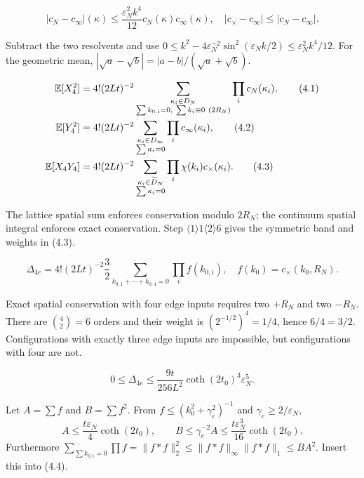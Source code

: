 \documentclass[11pt,a4paper]{article}
\newcommand{\eps}{\varepsilon}
\begin{document}
\[
 |c_N-c_\infty|(\kappa)
 \le\frac{\eps_N^2k^4}{12}c_N(\kappa)c_\infty(\kappa),\quad
 |c_\times-c_\infty|\le|c_N-c_\infty|.\tag{3.5}
\]

\Because Subtract the two resolvents and use
$0\le k^2-4\eps_N^{-2}\sin^2(\eps_Nk/2)\le\eps_N^2k^4/12$.
For the geometric mean,
$|\sqrt a-\sqrt b|=|a-b|/(\sqrt a+\sqrt b)$.

\QedStep


\begin{align*}
 \E[X_4^2]&=4!(2Lt)^{-2}
 \sum_{\substack{\kappa_i\in D_N\\\sum k_{0,i}=0,\ \sum k_i\equiv0\ (2R_N)}}
 \prod_i c_N(\kappa_i),\tag{4.1}\\
 \E[Y_4^2]&=4!(2Lt)^{-2}
 \sum_{\substack{\kappa_i\in D_\infty\\\sum\kappa_i=0}}
 \prod_i c_\infty(\kappa_i),\tag{4.2}\\
 \E[X_4Y_4]&=4!(2Lt)^{-2}
 \sum_{\substack{\kappa_i\in\widetilde D_N\\\sum\kappa_i=0}}
 \prod_i\chi(k_i)c_\times(\kappa_i).\tag{4.3}
\end{align*}

\Because The lattice spatial sum enforces conservation modulo $2R_N$; the continuum
spatial integral enforces exact conservation.  Step $\langle1\rangle1\langle2\rangle6$
gives the symmetric band and weights in (4.3).

\[
 \Delta_{4e}=4!(2Lt)^{-2}\frac32
 \sum_{k_{0,1}+\cdots+k_{0,4}=0}\prod_i f(k_{0,i}),\quad
 f(k_0)=c_\times(k_0,R_N).\tag{4.4}
\]

\Because Exact spatial conservation with four edge inputs requires two $+R_N$ and two
$-R_N$.  There are $\binom42=6$ orders and their weight is
$(2^{-1/2})^4=1/4$, hence $6/4=3/2$.  Configurations with exactly three edge inputs
are impossible, but configurations with four are not.

\[
 0\le\Delta_{4e}\le
 \frac{9t}{256L^2}\coth(2t_0)^3\eps_N^5.\tag{4.5}
\]

\Because Let $A=\sum f$ and $B=\sum f^2$.  From $f\le(k_0^2+\gamma_e^2)^{-1}$
and $\gamma_e\ge2/\eps_N$,
\[
 A\le\frac{t\eps_N}{4}\coth(2t_0),\qquad
 B\le\gamma_e^{-2}A\le\frac{t\eps_N^3}{16}\coth(2t_0).
\]
Furthermore
$\sum_{\sum k_{0,i}=0}\prod f=\|f*f\|_2^2
\le\|f*f\|_\infty\|f*f\|_1\le BA^2$.  Insert this into (4.4).
\end{document}
